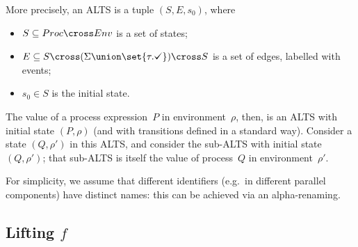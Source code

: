 More precisely, an ALTS is a tuple $(S,E,s_0)$, where
%
\begin{itemize}
\item $S \subseteq Proc \cross Env$ is a set of states;

\item $E \subseteq S \cross (\Sigma \union \set{\tau.\tick}) \cross S$ is a
  set of edges, labelled with events;

\item $s_0 \in S$ is the initial state.
\end{itemize}
%
The value of a process expression~$P$ in environment~$\rho$, then, is an ALTS
with initial state $(P,\rho)$ (and with transitions defined in a standard
way).  Consider a state $(Q,\rho')$ in this ALTS, and consider the sub-ALTS
with initial state $(Q,\rho')$; that sub-ALTS is itself the value of
process~$Q$ in environment~$\rho'$.


For simplicity, we assume that different identifiers (e.g.~in different
parallel components) have distinct names: this can be achieved via an
alpha-renaming.



\subsection{Lifting $f$}

